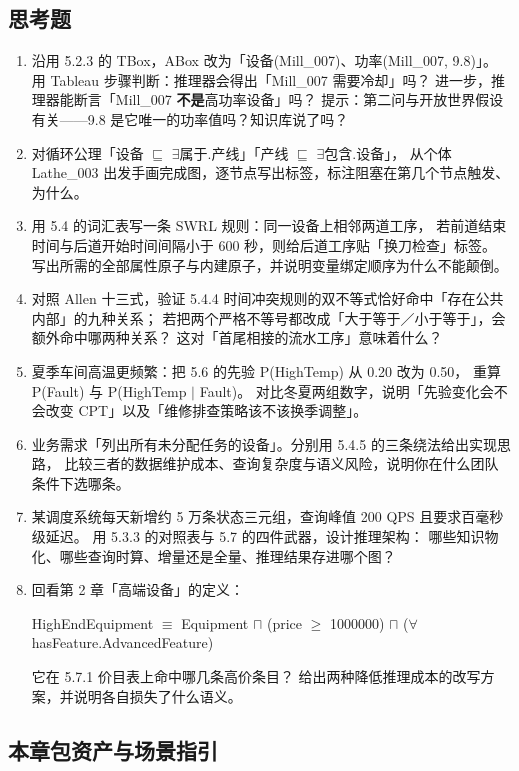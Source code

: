 \subsection*{思考题}

\begin{enumerate}
\item 沿用 5.2.3 的 TBox，ABox 改为「设备(Mill\_007)、功率(Mill\_007, 9.8)」。
  用 Tableau 步骤判断：推理器会得出「Mill\_007 需要冷却」吗？
  进一步，推理器能断言「Mill\_007 \textbf{不是}高功率设备」吗？
  提示：第二问与开放世界假设有关——9.8 是它唯一的功率值吗？知识库说了吗？
\item 对循环公理「设备 \(\sqsubseteq\) \(\exists\)属于.产线」「产线 \(\sqsubseteq\) \(\exists\)包含.设备」，
  从个体 Lathe\_003 出发手画完成图，逐节点写出标签，标注阻塞在第几个节点触发、为什么。
\item 用 5.4 的词汇表写一条 SWRL 规则：同一设备上相邻两道工序，
  若前道结束时间与后道开始时间间隔小于 600 秒，则给后道工序贴「换刀检查」标签。
  写出所需的全部属性原子与内建原子，并说明变量绑定顺序为什么不能颠倒。
\item 对照 Allen 十三式，验证 5.4.4 时间冲突规则的双不等式恰好命中「存在公共内部」的九种关系；
  若把两个严格不等号都改成「大于等于／小于等于」，会额外命中哪两种关系？
  这对「首尾相接的流水工序」意味着什么？
\item 夏季车间高温更频繁：把 5.6 的先验 P(HighTemp) 从 0.20 改为 0.50，
  重算 P(Fault) 与 P(HighTemp \(\mid\) Fault)。
  对比冬夏两组数字，说明「先验变化会不会改变 CPT」以及「维修排查策略该不该换季调整」。
\item 业务需求「列出所有未分配任务的设备」。分别用 5.4.5 的三条绕法给出实现思路，
  比较三者的数据维护成本、查询复杂度与语义风险，说明你在什么团队条件下选哪条。
\item 某调度系统每天新增约 5 万条状态三元组，查询峰值 200 QPS 且要求百毫秒级延迟。
  用 5.3.3 的对照表与 5.7 的四件武器，设计推理架构：
  哪些知识物化、哪些查询时算、增量还是全量、推理结果存进哪个图？
\item 回看第 2 章「高端设备」的定义：
  \begin{center}
  HighEndEquipment \(\equiv\) Equipment \(\sqcap\) (price \(\ge\) 1000000)
  \(\sqcap\) (\(\forall\)hasFeature.AdvancedFeature)
  \end{center}
  它在 5.7.1 价目表上命中哪几条高价条目？
  给出两种降低推理成本的改写方案，并说明各自损失了什么语义。
\end{enumerate}

\subsection*{本章包资产与场景指引}

